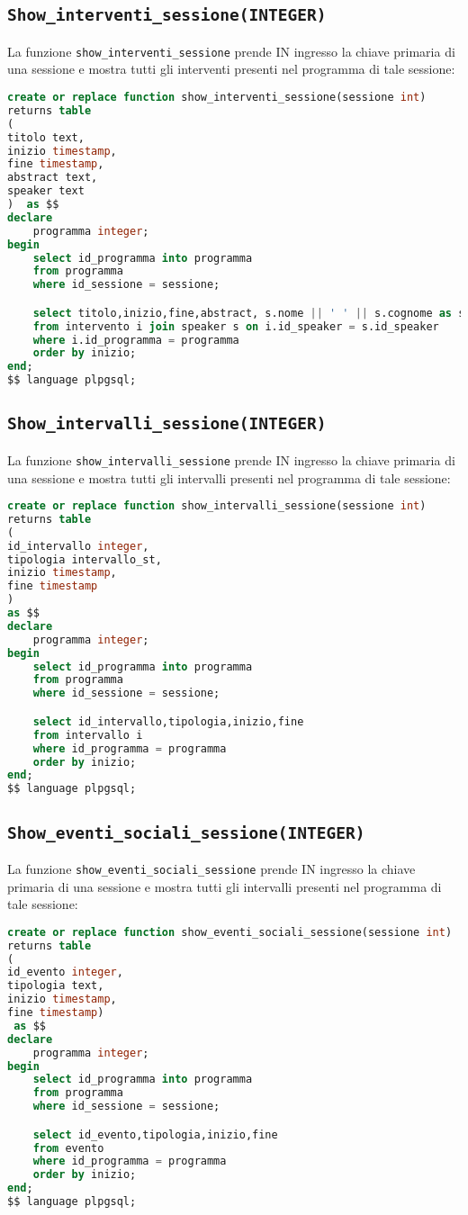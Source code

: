 \subsection{\texttt{Show\_interventi\_sessione(INTEGER)}}
La funzione \texttt{show\_interventi\_sessione} prende IN ingresso la chiave primaria di una sessione e mostra tutti gli interventi presenti nel programma di tale sessione:
\begin{lstlisting}[language=SQL,style=mystyle]
create or replace function show_interventi_sessione(sessione int)
returns table
(
titolo text,
inizio timestamp,
fine timestamp,
abstract text,
speaker text
)  as $$
declare 
    programma integer;
begin
    select id_programma into programma
    from programma
    where id_sessione = sessione;

    select titolo,inizio,fine,abstract, s.nome || ' ' || s.cognome as speaker
    from intervento i join speaker s on i.id_speaker = s.id_speaker
    where i.id_programma = programma
    order by inizio;
end;
$$ language plpgsql;
\end{lstlisting}

\subsection{\texttt{Show\_intervalli\_sessione(INTEGER)}}
La funzione \texttt{show\_intervalli\_sessione} prende IN ingresso la chiave primaria di una sessione e mostra tutti gli intervalli presenti nel programma di tale sessione:
\begin{lstlisting}[language=SQL,style=mystyle]
create or replace function show_intervalli_sessione(sessione int)
returns table
(
id_intervallo integer,
tipologia intervallo_st,
inizio timestamp,
fine timestamp
)  
as $$
declare 
    programma integer;
begin
    select id_programma into programma
    from programma
    where id_sessione = sessione;

    select id_intervallo,tipologia,inizio,fine
    from intervallo i
    where id_programma = programma
    order by inizio;
end;
$$ language plpgsql;
\end{lstlisting}
\subsection{\texttt{Show\_eventi\_sociali\_sessione(INTEGER)}}
La funzione \texttt{show\_eventi\_sociali\_sessione} prende IN ingresso la chiave primaria di una sessione e mostra tutti gli intervalli presenti nel programma di tale sessione:
\begin{lstlisting}[language=SQL,style=mystyle]
create or replace function show_eventi_sociali_sessione(sessione int)
returns table
(
id_evento integer,
tipologia text,
inizio timestamp,
fine timestamp) 
 as $$
declare 
    programma integer;
begin
    select id_programma into programma
    from programma
    where id_sessione = sessione;

    select id_evento,tipologia,inizio,fine
    from evento
    where id_programma = programma
    order by inizio;
end;
$$ language plpgsql;
\end{lstlisting}
